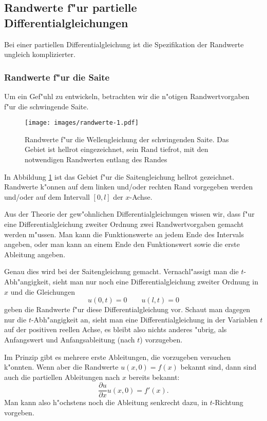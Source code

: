 \subsection{Randwerte f"ur partielle Differentialgleichungen\label{klassifikation:randwerte-pde}}
Bei einer partiellen Differentialgleichung ist die Spezifikation
der Randwerte ungleich komplizierter.
\subsubsection{Randwerte f"ur die Saite}
Um ein Gef"uhl zu entwickeln, betrachten wir die n"otigen
Randwertvorgaben f"ur die schwingende Saite.
\begin{figure}
\begin{center}
\texttt{[image: images/randwerte-1.pdf]}
\end{center}
\caption{Randwerte f"ur die Wellengleichung der schwingenden Saite.
Das Gebiet ist hellrot eingezeichnet, sein Rand tiefrot, mit den 
notwendigen Randwerten entlang des Randes\label{klassifikation:randwertesaite}}
\end{figure}
In Abbildung \ref{klassifikation:randwertesaite} ist das Gebiet f"ur
die Saitengleichung hellrot gezeichnet. Randwerte k"onnen auf dem
linken und/oder rechten Rand vorgegeben werden und/oder auf dem
Intervall $[0,l]$ der $x$-Achse.

Aus der Theorie der gew"ohnlichen Differentialgleichungen wissen wir,
dass f"ur eine Differentialgleichung zweiter Ordnung zwei Randwertvorgaben
gemacht werden m"ussen.
Man kann die Funktionswerte an jedem Ende des
Intervals angeben, oder man kann an einem Ende den Funktionswert
sowie die erste Ableitung angeben.

Genau dies wird bei der Saitengleichung gemacht. Vernachl"assigt man
die $t$-Abh"angigkeit, sieht man nur noch eine Differentialgleichung
zweiter Ordnung in $x$ und die Gleichungen 
\[
u(0,t)=0\qquad u(l,t)=0
\]
geben die Randwerte f"ur diese Differentialgleichung vor.
Schaut man dagegen nur die $t$-Abh"angigkeit an,
sieht man eine Differentialgleichung
in der Variablen $t$ auf der positiven reellen Achse, es bleibt also
nichts anderes "ubrig, als Anfangswert und Anfangsableitung (nach $t$)
vorzugeben.

Im Prinzip gibt es mehrere erste Ableitungen, die vorzugeben versuchen 
k"onnten. Wenn aber die Randwerte 
$ u(x,0)=f(x)$
bekannt sind, dann sind auch die partiellen Ableitungen nach $x$ bereits
bekannt:
\[
\frac{\partial u}{\partial x}u(x,0)=f'(x).
\]
Man kann also h"ochstens noch die Ableitung senkrecht dazu,
in $t$-Richtung vorgeben.

